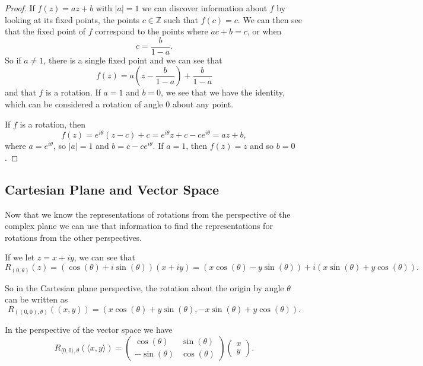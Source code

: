 \documentclass[
]{book}
\theoremstyle{definition}
\theoremstyle{definition}
\theoremstyle{definition}
\theoremstyle{definition}
\theoremstyle{remark}
\begin{document}
\begin{proof}

If \(f(z)=az+b\) with \(|a|=1\) we can discover information about \(f\) by looking at its fixed points, the points \(c\in \mathbb{Z}\) such that \(f(c)=c\). We can then see that the fixed point of \(f\) correspond to the points where \(ac+b=c\), or when \[c= \frac{b}{1-a}.\] So if \(a\neq 1\), there is a single fixed point and we can see that \[f(z)= a \left( z-\frac{b}{1-a}\right) + \frac{b}{1-a}\] and that \(f\) is a rotation. If \(a=1\) and \(b=0\), we see that we have the identity, which can be considered a rotation of angle \(0\) about any point.

If \(f\) is a rotation, then \[f(z) = e^{i\theta} (z-c)+c = e^{i\theta} z + c-ce^{i\theta} = az+b,\] where \(a=e^{i\theta}\), so \(|a|=1\) and \(b= c-ce^{i\theta}\). If \(a=1\), then \(f(z)=z\) and so \(b=0\).

\end{proof}

\hypertarget{cartesian-plane-and-vector-space-1}{%
\subsection{Cartesian Plane and Vector Space}\label{cartesian-plane-and-vector-space-1}}

Now that we know the representations of rotations from the perspective of the complex plane we can use that information to find the representations for rotations from the other perspectives.

If we let \(z=x+iy\), we can see that \[R_{(0,\theta)}(z) = (\cos(\theta) + i \sin(\theta)) (x+iy) = \left(x\cos(\theta) - y \sin(\theta)\right) + i \left(x\sin(\theta) + y \cos(\theta) \right).\]

So in the Cartesian plane perspective, the rotation about the origin by angle \(\theta\) can be written as \[R_{\left((0,0),\theta\right)}\left((x,y)\right)= \left( x \cos(\theta)+y\sin(\theta), -x\sin(\theta)+y\cos(\theta)\right).\]

In the perspective of the vector space we have
\[R_{\langle 0,0\rangle, \theta} \left( \langle x,y\rangle \right) = \begin{pmatrix} \cos(\theta) & \sin(\theta) \\ -\sin(\theta) & \cos(\theta) \end{pmatrix} \begin{pmatrix} x \\ y \end{pmatrix} .\]
\end{document}
